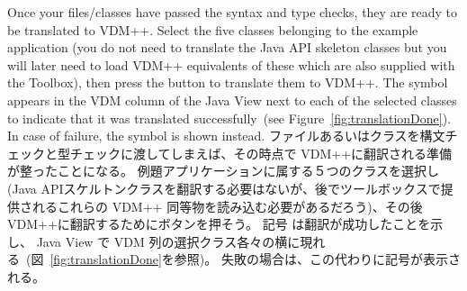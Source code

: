 \documentclass[\pformat,12pt]{jarticle}
\newcommand{\guicmd}[1]{{\sf #1}}
\begin{document}
Once your files/classes have passed the syntax and type checks, they
are ready to be translated to VDM++. Select the five classes belonging
to the example application (you do not need to translate the Java API
skeleton classes but you will later need to load VDM++ equivalents of
these which are also supplied with the Toolbox), then press the
button to translate them to VDM++. The symbol 
appears in the \guicmd{VDM} column of the \guicmd{Java View} next to
each of the selected classes to indicate that it was translated
successfully~(see Figure~\ref{fig:translationDone}). In case of failure,
the symbol  
is shown instead.
ファイルあるいはクラスを構文チェックと型チェックに渡してしまえば、その時点で VDM++に翻訳される準備が整ったことになる。 
例題アプリケーションに属する５つのクラスを選択し(Java APIスケルトンクラスを翻訳する必要はないが、後でツールボックスで提供されるこれらの VDM++ 同等物を読み込む必要があるだろう)、その後 VDM++に翻訳するためにボタンを押そう。 
記号 は翻訳が成功したことを示し、 \guicmd{Java View} で \guicmd{VDM} 列の選択クラス各々の横に現れる~(図~\ref{fig:translationDone}を参照)。 
失敗の場合は、この代わりに記号が表示される。
\end{document}

